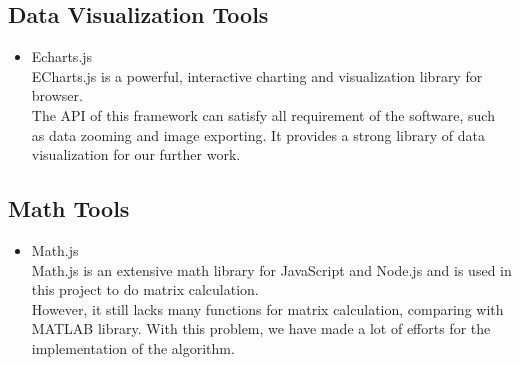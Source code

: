 \subsection{Data Visualization Tools}
\begin{itemize}
    \item Echarts.js\\
    ECharts.js is a powerful, interactive charting and visualization library for browser.\\
    The API of this framework can satisfy all requirement of the software, such as data zooming and image exporting. It provides a strong library of data visualization for our further work.
\end{itemize}

\subsection{Math Tools}
\begin{itemize}
    \item Math.js\\
    Math.js is an extensive math library for JavaScript and Node.js and is used in this project to do matrix calculation.\\
    However, it still lacks many functions for matrix calculation, comparing with MATLAB library. With this problem, we have made a lot of efforts for the implementation of the algorithm. 
\end{itemize}
